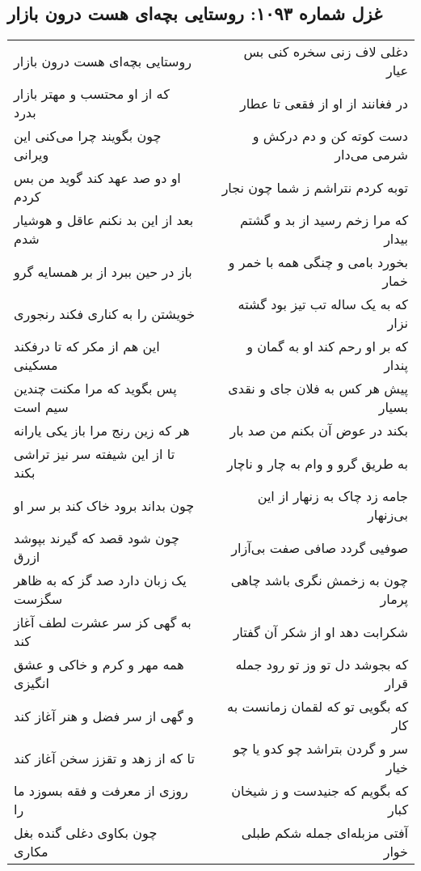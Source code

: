 \begin{center}
\section*{غزل شماره ۱۰۹۳: روستایی بچه‌ای هست درون بازار}
\label{sec:1093}
\begin{longtable}{l p{0.5cm} r}
روستایی بچه‌ای هست درون بازار
&&
دغلی لاف زنی سخره کنی بس عیار
\\
که از او محتسب و مهتر بازار بدرد
&&
در فغانند از او از فقعی تا عطار
\\
چون بگویند چرا می‌کنی این ویرانی
&&
دست کوته کن و دم درکش و شرمی می‌دار
\\
او دو صد عهد کند گوید من بس کردم
&&
توبه کردم نتراشم ز شما چون نجار
\\
بعد از این بد نکنم عاقل و هوشیار شدم
&&
که مرا زخم رسید از بد و گشتم بیدار
\\
باز در حین ببرد از بر همسایه گرو
&&
بخورد بامی و چنگی همه با خمر و خمار
\\
خویشتن را به کناری فکند رنجوری
&&
که به یک ساله تب تیز بود گشته نزار
\\
این هم از مکر که تا درفکند مسکینی
&&
که بر او رحم کند او به گمان و پندار
\\
پس بگوید که مرا مکنت چندین سیم است
&&
پیش هر کس به فلان جای و نقدی بسیار
\\
هر که زین رنج مرا باز یکی یارانه
&&
بکند در عوض آن بکنم من صد بار
\\
تا از این شیفته سر نیز تراشی بکند
&&
به طریق گرو و وام به چار و ناچار
\\
چون بداند برود خاک کند بر سر او
&&
جامه زد چاک به زنهار از این بی‌زنهار
\\
چون شود قصد که گیرند بپوشد ازرق
&&
صوفیی گردد صافی صفت بی‌آزار
\\
یک زبان دارد صد گز که به ظاهر سگزست
&&
چون به زخمش نگری باشد چاهی پرمار
\\
به گهی کز سر عشرت لطف آغاز کند
&&
شکرابت دهد او از شکر آن گفتار
\\
همه مهر و کرم و خاکی و عشق انگیزی
&&
که بجوشد دل تو وز تو رود جمله قرار
\\
و گهی از سر فضل و هنر آغاز کند
&&
که بگویی تو که لقمان زمانست به کار
\\
تا که از زهد و تقزز سخن آغاز کند
&&
سر و گردن بتراشد چو کدو یا چو خیار
\\
روزی از معرفت و فقه بسوزد ما را
&&
که بگویم که جنیدست و ز شیخان کبار
\\
چون بکاوی دغلی گنده بغل مکاری
&&
آفتی مزبله‌ای جمله شکم طبلی خوار

\end{longtable}
\end{center}
